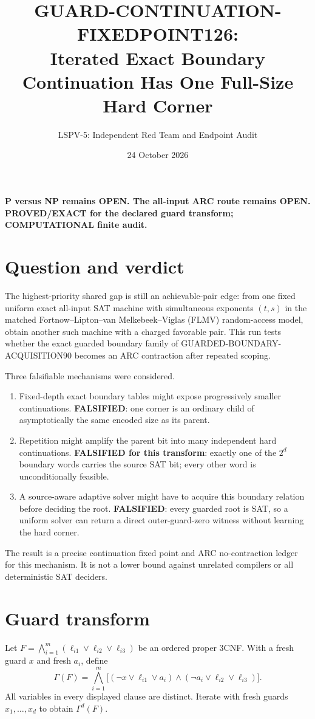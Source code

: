 \documentclass[11pt]{article}
\title{GUARD-CONTINUATION-FIXEDPOINT126:\\
Iterated Exact Boundary Continuation Has One Full-Size Hard Corner}
\author{LSPV-5: Independent Red Team and Endpoint Audit}
\date{24 October 2026}
\newcommand{\Gam}{\Gamma}
\begin{document}
\maketitle

\begin{center}
\textbf{P versus NP remains OPEN. The all-input ARC route remains OPEN.}\\
\textbf{PROVED/EXACT for the declared guard transform; COMPUTATIONAL finite audit.}
\end{center}

\section{Question and verdict}
The highest-priority shared gap is still an achievable-pair edge: from one
fixed uniform exact all-input SAT machine with simultaneous exponents
$(t,s)$ in the matched Fortnow--Lipton--van Melkebeek--Viglas (FLMV)
random-access model, obtain another such machine with a charged favorable
pair.  This run tests whether the exact guarded boundary family of
GUARDED-BOUNDARY-ACQUISITION90 becomes an ARC contraction after repeated
scoping.

Three falsifiable mechanisms were considered.
\begin{enumerate}
\item Fixed-depth exact boundary tables might expose progressively smaller
continuations.  \textbf{FALSIFIED}: one corner is an ordinary child of
asymptotically the same encoded size as its parent.
\item Repetition might amplify the parent bit into many independent hard
continuations.  \textbf{FALSIFIED for this transform}: exactly one of the
$2^d$ boundary words carries the source SAT bit; every other word is
unconditionally feasible.
\item A source-aware adaptive solver might have to acquire this boundary
relation before deciding the root.  \textbf{FALSIFIED}: every guarded root
is SAT, so a uniform solver can return a direct outer-guard-zero witness
without learning the hard corner.
\end{enumerate}
The result is a precise continuation fixed point and ARC no-contraction
ledger for this mechanism.  It is not a lower bound against unrelated
compilers or all deterministic SAT deciders.

\section{Guard transform}
Let $F=\bigwedge_{i=1}^m(\ell_{i1}\vee\ell_{i2}\vee\ell_{i3})$ be an
ordered proper 3CNF.  With a fresh guard $x$ and fresh $a_i$, define
\[
 \Gam(F)=\bigwedge_{i=1}^m
 \bigl[(\neg x\vee\ell_{i1}\vee a_i)\wedge
       (\neg a_i\vee\ell_{i2}\vee\ell_{i3})\bigr].                 \tag{1}
\]
All variables in every displayed clause are distinct.  Iterate with fresh
guards $x_1,\ldots,x_d$ to obtain $\Gam^d(F)$.
\end{document}
